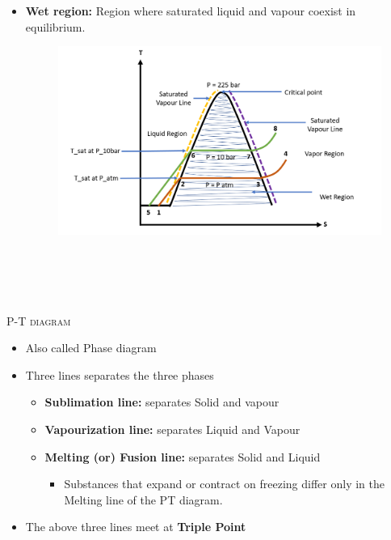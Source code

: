 \documentclass[8pt]{article}
\begin{document}
\begin{itemize}
		\item \textbf{Wet region: } Region where saturated liquid and vapour coexist in equilibrium.
		\begin{figure}[H]
			\includegraphics[scale=0.5]{Phasechange.png}
			\centering
		\end{figure}
	\end{itemize}\hrulefill\\\\
\\\\
\textsc{P-T diagram}
	\begin{itemize}
		\item Also called Phase diagram
		\item Three lines separates the three phases
			\begin{itemize}
				\item \textbf{Sublimation line: }separates Solid and vapour
				\item \textbf{Vapourization line: }separates Liquid and Vapour
				\item \textbf{Melting (or) Fusion line: }separates Solid and Liquid
					\begin{itemize}
						\item Substances that expand or contract on freezing differ only in the Melting line of the PT diagram.
					\end{itemize}
			\end{itemize}
		\item The above three lines meet at \textbf{Triple Point}
		
	\end{itemize}
\end{document}
